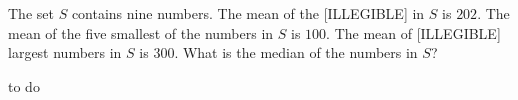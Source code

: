The set $S$ contains nine numbers. The mean of the [ILLEGIBLE] in $S$ is $202$. The mean of the five smallest of the numbers in $S$ is $100$. The mean of [ILLEGIBLE] largest numbers in $S$ is $300$. What is the median of the numbers in $S$?
\begin{answer}
to do
\end{answer}
